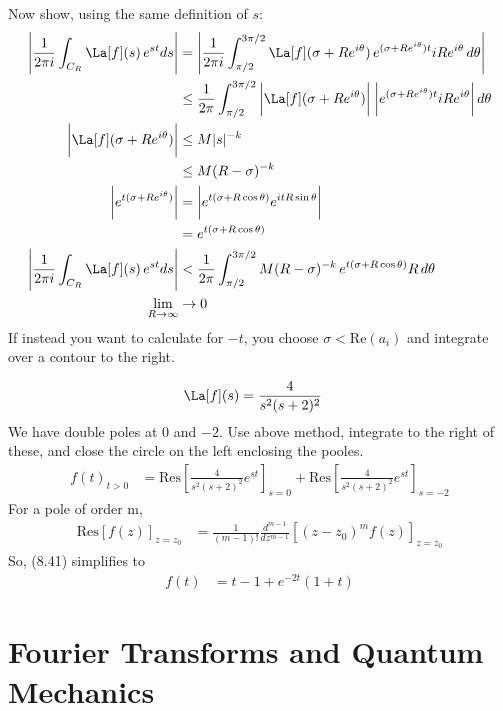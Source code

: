 \documentclass[cplx.tex]{subfiles}
\begin{document}
Now show, using the same definition of $s$:
\begin{align}
    \Bigg| \frac{1}{2\pi i} \int_{C_R} \La[f](s)\,e^{st}ds\Bigg| &= \Bigg| \frac{1}{2\pi i} \int_{\pi/2}^{3\pi/2} \La[f](\sigma+Re^{i\theta})\, e^{(\sigma+Re^{i\theta})t} iRe^{i\theta}\,d\theta \Bigg|\\
                                                                 &\leq \frac{1}{2\pi} \int_{\pi/2}^{3\pi/2} \bigg|\La[f](\sigma+Re^{i\theta})\bigg|\;\bigg|e^{(\sigma+Re^{i\theta})t}iRe^{i\theta}\bigg|\,d\theta \\
    \bigg| \La[f](\sigma+Re^{i\theta})\bigg| &\leq M|s|^{-k} \\
                                             &\leq M(R-\sigma)^{-k} \\
    \bigg| e^{t(\sigma+Re^{i\theta})}\bigg| &= \bigg|e^{t(\sigma+R\cos\theta)}e^{itR\sin\theta}\bigg| \\
                                            &= e^{t(\sigma+R\cos\theta)} \\
    \Bigg| \frac{1}{2\pi i} \int_{C_R} \La[f](s)\,e^{st}ds\Bigg| &< \frac{1}{2\pi} \int_{\pi/2}^{3\pi/2} M(R-\sigma)^{-k}\,e^{t(\sigma+R\cos\theta)}R\,d\theta \\
    \lim_{R\to\infty} &\to 0
\end{align}
If instead you want to calculate for $-t$, you choose $\sigma < \text{Re}(a_i)$ and integrate over a contour to the right.

\begin{example}
\begin{align}
    \La[f](s) &= \frac{4}{s^2(s+2)^2}
\end{align}
We have double poles at $0$ and $-2$.
Use above method, integrate to the right of these, and close the circle on the left enclosing the pooles.
\begin{align}
    f(t)_{t>0} &= \text{Res}\left[\frac{4}{s^2(s+2)^2}e^{st}\right]_{s=0} + \text{Res}\left[\frac{4}{s^2(s+2)^2}e^{st}\right]_{s=-2} 
\end{align}
For a pole of order m,
\begin{align}
    \text{Res}[f(z)]_{z=z_0} &= \frac{1}{(m-1)!} \frac{d^{m-1}}{dz^{m-1}} \left[(z-z_0)^mf(z)\right]_{z=z_0}
\end{align}
So, (8.41) simplifies to
\begin{align}
    f(t) &= t-1+e^{-2t}(1+t)
\end{align}
\end{example}

\chapter{Fourier Transforms and Quantum Mechanics}
\end{document}
